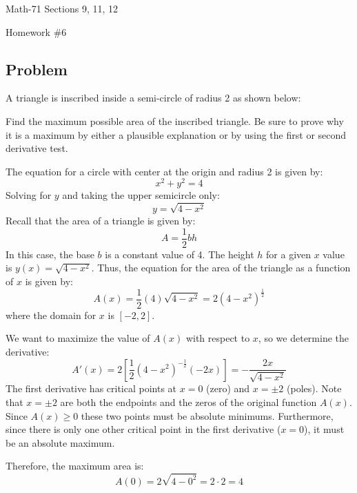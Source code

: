 \documentclass[letterpaper,12pt,fleqn]{article}
\begin{document}
\begin{center}
  \large
  Math-71 Sections 9, 11, 12

  \Large
  Homework \#6
\end{center}

\subsection*{Problem}

A triangle is inscribed inside a semi-circle of radius 2 as shown below:

\bigskip

\begin{center}
\end{center}

\bigskip

Find the maximum possible area of the inscribed triangle.  Be sure to prove why it is a maximum by either a plausible
explanation or by using the first or second derivative test.

The equation for a circle with center at the origin and radius 2 is given by:
\[x^2+y^2=4\]
Solving for \(y\) and taking the upper semicircle only:
\[y=\sqrt{4-x^2}\]
Recall that the area of a triangle is given by:
\[A=\frac{1}{2}bh\]
In this case, the base \(b\) is a constant value of 4.  The height \(h\) for a given \(x\) value is \(y(x)=\sqrt{4-x^2}\).
Thus, the equation for the area of the triangle as a function of \(x\) is given by:
\[A(x)=\frac{1}{2}(4)\sqrt{4-x^2}=2(4-x^2)^{\frac{1}{2}}\]
where the domain for \(x\) is \([-2,2]\).

We want to maximize the value of \(A(x)\) with respect to \(x\), so we determine the derivative:
\[A'(x)=2\left[\frac{1}{2}(4-x^2)^{-\frac{1}{2}}(-2x)\right]=-\frac{2x}{\sqrt{4-x^2}}\]
The first derivative has critical points at \(x=0\) (zero) and \(x=\pm2\) (poles).  Note that \(x=\pm2\) are both the
endpoints and the zeros of the original function \(A(x)\).  Since \(A(x)\ge0\) these two points must be absolute minimums.
Furthermore, since there is only one other critical point in the first derivative (\(x=0\)), it must be an absolute maximum.

Therefore, the maximum area is:
\[A(0)=2\sqrt{4-0^2}=2\cdot2=4\]
\end{document}
